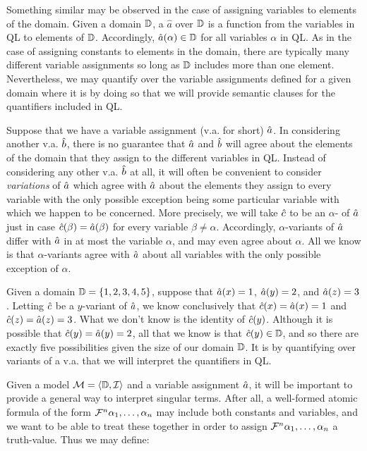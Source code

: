Something similar may be observed in the case of assigning variables to elements of the domain.
Given a domain $\mathbb{D}$, a  $\hat{a}$ over $\mathbb{D}$ is a function from the variables in QL to elements of $\mathbb{D}$.
Accordingly, $\hat{a}(\alpha)\in\mathbb{D}$ for all variables $\alpha$ in QL. 
As in the case of assigning constants to elements in the domain, there are typically many different variable assignments so long as $\mathbb{D}$ includes more than one element. 
Nevertheless, we may quantify over the variable assignments defined for a given domain where it is by doing so that we will provide semantic clauses for the quantifiers included in QL.

Suppose that we have a variable assignment (v.a. for short) $\hat{a}$.
In considering another v.a. $\hat{b}$, there is no guarantee that $\hat{a}$ and $\hat{b}$ will agree about the elements of the domain that they assign to the different variables in QL.
Instead of considering any other v.a. $\hat{b}$ at all, it will often be convenient to consider \textit{variations} of $\hat{a}$ which agree with $\hat{a}$ about the elements they assign to every variable with the only possible exception being some particular variable with which we happen to be concerned.
More precisely, we will take $\hat{c}$ to be an $\alpha$- of $\hat{a}$ just in case $\hat{c}(\beta)=\hat{a}(\beta)$ for every variable $\beta\neq\alpha$.
Accordingly, $\alpha$-variants of $\hat{a}$ differ with $\hat{a}$ in at most the variable $\alpha$, and may even agree about $\alpha$.
All we know is that $\alpha$-variants agree with $\hat{a}$ about all variables with the only possible exception of $\alpha$.

Given a domain $\mathbb{D}=\lbrace1,2,3,4,5\rbrace$, suppose that $\hat{a}(x)=1$, $\hat{a}(y)=2$, and $\hat{a}(z)=3$.
Letting $\hat{c}$ be a $y$-variant of $\hat{a}$, we know conclusively that $\hat{c}(x)=\hat{a}(x)=1$ and $\hat{c}(z)=\hat{a}(z)=3$.
What we don't know is the identity of $\hat{c}(y)$.
Although it is possible that $\hat{c}(y)=\hat{a}(y)=2$, all that we know is that $\hat{c}(y)\in\mathbb{D}$, and so there are exactly five possibilities given the size of our domain $\mathbb{D}$.
It is by quantifying over variants of a v.a. that we will interpret the quantifiers in QL.

Given a model $\mathcal{M}=\langle\mathbb{D},\mathcal{I}\rangle$ and a variable assignment $\hat{a}$, it will be important to provide a general way to interpret singular terms.
After all, a well-formed atomic formula of the form $\mathcal{F}^n\alpha_1,\ldots,\alpha_n$ may include both constants and variables, and we want to be able to treat these together in order to assign $\mathcal{F}^n\alpha_1,\ldots,\alpha_n$ a truth-value. 
Thus we may define:

